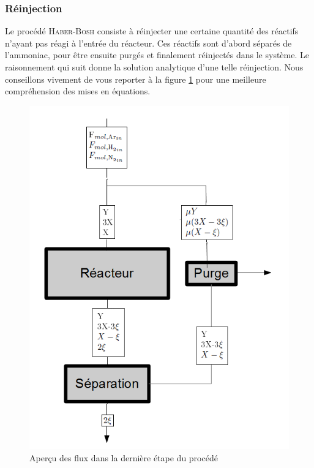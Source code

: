 \subsubsection{Réinjection}

Le procédé \textsc{Haber-Bosh} consiste à réinjecter une certaine quantité des réactifs n'ayant pas réagi à l'entrée du réacteur. Ces réactifs sont d'abord séparés de l'ammoniac, pour être ensuite purgés et finalement réinjectés dans le système. Le raisonnement qui suit donne la solution analytique d'une telle réinjection. Nous conseillons vivement de vous reporter à la figure \ref{Schema_synthese} pour une meilleure compréhension des mises en équations.

\begin{figure}[ht!]
\centering
\includegraphics[scale=0.4]{Schema_synthese.png}
\caption{Aperçu des flux dans la dernière étape du procédé}
\label{Schema_synthese}
\end{figure}

